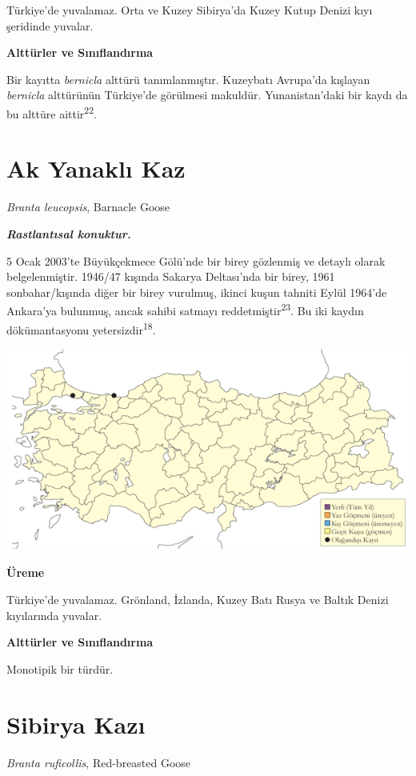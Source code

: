 \documentclass[
  letterpaper,
  DIV=11,
  numbers=noendperiod]{scrreprt}
\begin{document}
Türkiye'de yuvalamaz. Orta ve Kuzey Sibirya'da Kuzey Kutup Denizi kıyı
şeridinde yuvalar.

\textbf{Alttürler ve Sınıflandırma}

Bir kayıtta \emph{bernicla} alttürü tanımlanmıştır. Kuzeybatı Avrupa'da
kışlayan \emph{bernicla} alttürünün Türkiye'de görülmesi makuldür.
Yunanistan'daki bir kaydı da bu alttüre aittir\textsuperscript{22}.

\section{Ak Yanaklı Kaz}\label{ak-yanaklux131-kaz}

\emph{Branta leucopsis}, Barnacle Goose

\textbf{\emph{Rastlantısal konuktur.}}

5 Ocak 2003'te Büyükçekmece Gölü'nde bir birey gözlenmiş ve detaylı
olarak belgelenmiştir. 1946/47 kışında Sakarya Deltası'nda bir birey,
1961 sonbahar/kışında diğer bir birey vurulmuş, ikinci kuşun tahniti
Eylül 1964'de Ankara'ya bulunmuş, ancak sahibi satmayı
reddetmiştir\textsuperscript{23}. Bu iki kaydın dökümantasyonu
yetersizdir\textsuperscript{18}.

\includegraphics{images/harita_Page_006.png}

\textbf{Üreme}

Türkiye'de yuvalamaz. Grönland, İzlanda, Kuzey Batı Rusya ve Baltık
Denizi kıyılarında yuvalar.

\textbf{Alttürler ve Sınıflandırma}

Monotipik bir türdür.

\section{Sibirya Kazı}\label{sibirya-kazux131}

\emph{Branta ruficollis}, Red-breasted Goose
\end{document}
